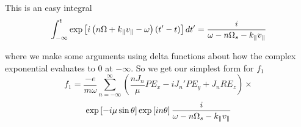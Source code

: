 This is an easy integral
\begin{equation}
	\int_{-\infty}^t \exp \left[i\left(n\Omega + k_\parallel v_\parallel - \omega\right) \left(t' - t\right)\right] dt' = \frac{i}{\omega - n\Omega_s - k_\parallel v_\parallel}
\end{equation}

where we make some arguments using delta functions about how the complex exponential evaluates to 0 at $-\infty$. So we get our simplest form for $f_1$
\begin{equation*}
	f_1 = \frac{-e}{m \omega} \sum_{n=-\infty}^\infty \left(\frac{nJ_n}{\mu} P E_x - i J_n' P E_y + J_n R E_z \right) \times
\end{equation*}
\begin{equation}
	\exp \left[-i\mu \sin\theta \right] \exp \left[in \theta \right] \frac{i}{\omega - n\Omega_s - k_\parallel v_\parallel}
\end{equation}

